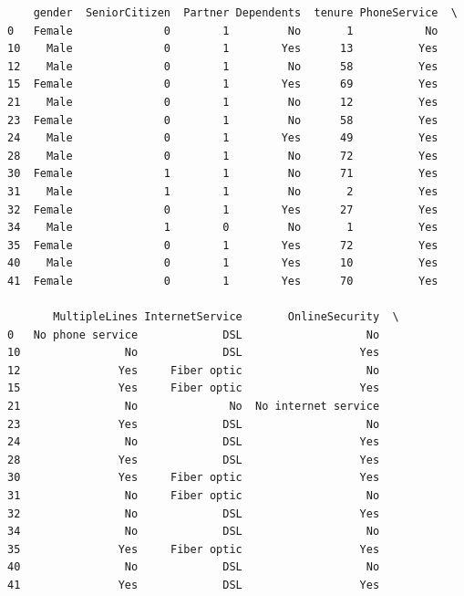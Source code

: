 \documentclass[8pt,onecolumn,aps,pra]{revtex4-1}
\begin{document}
    
    \begin{verbatim}
    gender  SeniorCitizen  Partner Dependents  tenure PhoneService  \
0   Female              0        1         No       1           No   
10    Male              0        1        Yes      13          Yes   
12    Male              0        1         No      58          Yes   
15  Female              0        1        Yes      69          Yes   
21    Male              0        1         No      12          Yes   
23  Female              0        1         No      58          Yes   
24    Male              0        1        Yes      49          Yes   
28    Male              0        1         No      72          Yes   
30  Female              1        1         No      71          Yes   
31    Male              1        1         No       2          Yes   
32  Female              0        1        Yes      27          Yes   
34    Male              1        0         No       1          Yes   
35  Female              0        1        Yes      72          Yes   
40    Male              0        1        Yes      10          Yes   
41  Female              0        1        Yes      70          Yes   

       MultipleLines InternetService       OnlineSecurity  \
0   No phone service             DSL                   No   
10                No             DSL                  Yes   
12               Yes     Fiber optic                   No   
15               Yes     Fiber optic                  Yes   
21                No              No  No internet service   
23               Yes             DSL                   No   
24                No             DSL                  Yes   
28               Yes             DSL                  Yes   
30               Yes     Fiber optic                  Yes   
31                No     Fiber optic                   No   
32                No             DSL                  Yes   
34                No             DSL                   No   
35               Yes     Fiber optic                  Yes   
40                No             DSL                   No   
41               Yes             DSL                  Yes   


\end{verbatim}
\end{document}
